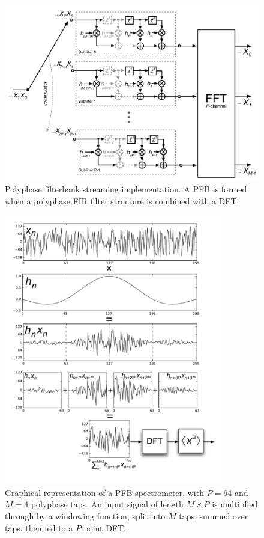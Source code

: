 \documentclass{ws-rv961x669}
\begin{document}
\begin{figure}
 \centering
 \includegraphics[width=\textwidth]{./figures/pfb_fir_fft}
 \caption{Polyphase filterbank streaming implementation. A PFB is formed when a polyphase FIR filter structure is combined with a DFT.\label{fig:pfb_fir_fft}}
\end{figure}

\begin{figure}
 \centering
 \includegraphics[width=0.85\textwidth]{./figures/pfb_chart}
 \caption{Graphical representation of a PFB spectrometer, with $P=64$ and $M=4$ polyphase taps. An input signal of length $M\times P$ is multiplied through by a windowing function, split into $M$ taps, summed over taps, then fed to a $P$ point DFT. \label{fig:pfb_chart}}
\end{figure}
\end{document}
